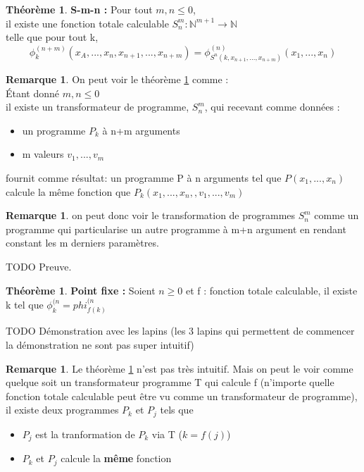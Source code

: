 \documentclass[11pt,a4paper]{article}
\newcommand{\N}{\mathbb{N}}
\theoremstyle{definition}
\newtheorem{myrem}[mydef]{Remarque}
\newtheorem{mytheo}[mydef]{Théorème}
\begin{document}
\begin{mytheo}
	\label{S-m-n}
	\textbf{S-m-n :} Pour tout $m,n \leq 0$, \\
	il existe une fonction totale calculable $S^m_n : \N^{m+1} \rightarrow 
	\N$ \\
	telle que pour tout k,
	$$ \phi^{(n+m)}_k(x_A,...,x_n,x_{n+1},...,x_{n+m}) = 
	\phi^{(n)}_{S^n(k,x_{n+1}, ...,x_{n+m})} (x_1,...,x_n)$$
\end{mytheo}

\begin{myrem}
	On peut voir le théorème \ref{S-m-n} comme : \\
	Étant donné $m,n \leq 0$\\
	il existe un transformateur de programme, $S^m_n$, qui recevant comme 
	données : 
	\begin{itemize}
		\item un programme $P_k$ à n+m arguments
		\item m valeurs $v_1,...,v_m$
	\end{itemize}
	fournit comme résultat: un programme P à n arguments tel que 
	$P(x_1,...,x_n)$ calcule la même fonction que 
	$P_k(x_1,...,x_n,,v_1,...,v_m)$
\end{myrem}

\begin{myrem}
	on peut donc voir le transformation de programmes $S^m_n$ comme un 
	programme qui particularise un autre programme à m+n argument en rendant 
	constant les m derniers paramètres.
\end{myrem}
TODO Preuve.

\begin{mytheo}
	\label{point-fixe}
	\textbf{Point fixe :} Soient $n \geq 0$ et f : fonction totale 
	calculable, il existe k tel que $\phi^{(n}_k = phi^{(n}_{f(k)}$  
\end{mytheo}

TODO Démonstration avec les lapins (les 3 lapins qui permettent
de commencer la démonstration ne sont pas super intuitif)
\begin{myrem}
	Le théorème \ref{point-fixe} n'est pas très intuitif. Mais on peut le 
	voir comme quelque soit un transformateur programme T qui calcule f 
	(n'importe quelle fonction totale calculable peut être vu comme un transformateur 
	de programme), \\
	il existe deux programmes $P_k$ et $P_j$ tels que 
	\begin{itemize}
		\item $P_j$ est la tranformation de $P_k$ via T ($k=f(j)$)
		\item $P_k$ et $P_j$ calcule la \textbf{même} fonction
	\end{itemize}
\end{myrem}
\end{document}
